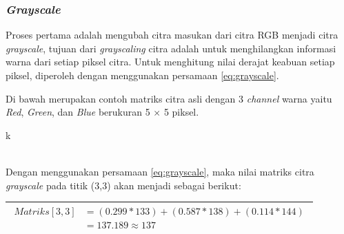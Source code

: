 \subsubsection{\textit{Grayscale}}
\noindent Proses pertama adalah mengubah citra masukan dari citra RGB menjadi citra \textit{grayscale}, tujuan dari \textit{grayscaling} citra adalah untuk menghilangkan informasi warna dari setiap piksel citra. Untuk menghitung nilai derajat keabuan setiap piksel, diperoleh dengan menggunakan persamaan \ref{eq:grayscale}.

\noindent Di bawah merupakan contoh matriks citra asli dengan 3 \textit{channel} warna yaitu \textit{Red}, \textit{Green}, dan \textit{Blue} berukuran 5 $\times$ 5 piksel. \\

\begin{adjustbox}{width=1\textwidth}
	\noindent\begin{minipage}{\linewidth}
		\label{fig:MatriksCitraAsal}k
	\end{minipage}
\end{adjustbox} \\

\noindent Dengan menggunakan persamaan \ref{eq:grayscale}, maka nilai matriks citra \textit{grayscale} pada titik (3,3) akan menjadi sebagai berikut:
\begin{table}[H]
	\begin{adjustbox}{width=1\textwidth}
		\begin{tabular}{|p{13.55cm}|}
			\hline
			\begin{equation}\nonumber
			\begin{aligned}
			Matriks[3,3] &= (0.299 * 133) + (0.587 * 138) + (0.114 * 144) \\
						 &= 137.189 \approx 137 
			\end{aligned}
			\end{equation}\\
			\hline
		\end{tabular}
	\end{adjustbox}
\end{table}

